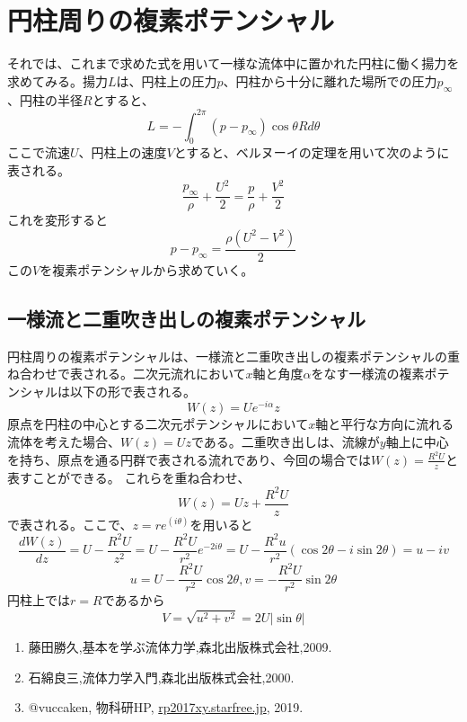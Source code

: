 \documentclass[10pt,b5paper,papersize,dvipdfmx]{jsbook}
\begin{document}
\section{円柱周りの複素ポテンシャル}
それでは、これまで求めた式を用いて一様な流体中に置かれた円柱に働く揚力を求めてみる。揚力$L$は、円柱上の圧力$p$、円柱から十分に離れた場所での圧力$p_\infty$、円柱の半径$R$とすると、
\begin{equation}
L=-\int_0^{2\pi}(p-p_\infty)\cos\theta Rd\theta
\end{equation}
ここで流速$U$、円柱上の速度$V$とすると、ベルヌーイの定理を用いて次のように表される。
\begin{equation}
\frac{p_\infty}{\rho}+\frac{U^2}{2}=\frac{p}{\rho}+\frac{V^2}{2}
\end{equation}
これを変形すると
\begin{equation}
p-p_\infty=\frac{\rho(U^2-V^2)}{2}
\end{equation}
この$V$を複素ポテンシャルから求めていく。
\par
\subsection{一様流と二重吹き出しの複素ポテンシャル}
円柱周りの複素ポテンシャルは、一様流と二重吹き出しの複素ポテンシャルの重ね合わせで表される。二次元流れにおいて$x$軸と角度$\alpha$をなす一様流の複素ポテンシャルは以下の形で表される。
\begin{equation}
  W(z)=Ue^{-i\alpha}z
\end{equation}
原点を円柱の中心とする二次元ポテンシャルにおいて$x$軸と平行な方向に流れる流体を考えた場合、$W(z)=Uz$である。二重吹き出しは、流線が$y$軸上に中心を持ち、原点を通る円群で表される流れであり、今回の場合では$W(z)=\frac{R^2U}{z}$と表すことができる。
これらを重ね合わせ、
\begin{equation}
  W(z)=Uz+\frac{R^2U}{z}
\end{equation}
で表される。ここで、$z=re^(i\theta)$を用いると
\begin{equation}
  \frac{dW(z)}{dz}=U-\frac{R^2U}{z^2}=U-\frac{R^2U}{r^2}e^{-2i\theta}=U-\frac{R^2u}{r^2}(\cos2\theta-i\sin2\theta)=u-iv
\end{equation}
\begin{equation}
　u=U-\frac{R^2U}{r^2}\cos2\theta, v=-\frac{R^2U}{r^2}\sin2\theta
\end{equation}
円柱上では$r=R$であるから
\begin{equation}
  V=\sqrt{u^2+v^2}=2U|\sin\theta|
\end{equation}
\begin{sanko}
  \begin{enumerate}
    \item 藤田勝久,基本を学ぶ流体力学,森北出版株式会社,2009.
    \item 石綿良三,流体力学入門,森北出版株式会社,2000.
    \item @vuccaken, 物科研HP, \url{rp2017xy.starfree.jp}, 2019.
  \end{enumerate}
\end{sanko}
\end{document}
